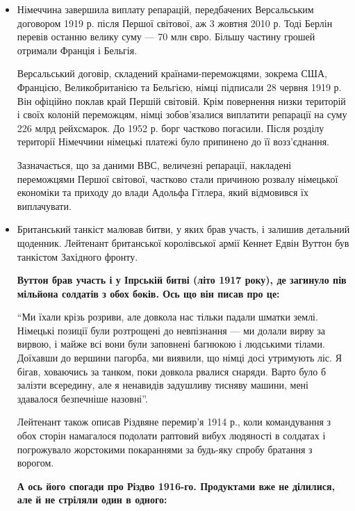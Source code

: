 \begin{itemize}
	
\item  Німеччина завершила виплату репарацій, передбачених Версальським
договором 1919 р. після Першої світової, аж 3 жовтня 2010 р. Тоді
Берлін перевів останню велику суму --- 70 млн євро. Більшу частину
грошей отримали Франція і Бельгія.

Версальський договір, складений країнами-переможцями, зокрема США,
Францією, Великобританією та Бельгією, німці підписали 28 червня 1919 р.
Він офіційно поклав край Першій світовій. Крім повернення низки територій
і своїх колоній переможцям, німці зобов'язалися виплатити репарації на
суму 226 млрд рейхсмарок. До 1952 р. борг частково погасили. Після розділу
території Німеччини німецькі платежі було припинено до її возз'єднання.

Зазначається, що за даними ВВС, величезні репарації, накладені переможцями
Першої світової, частково стали причиною розвалу німецької економіки та
приходу до влади Адольфа Гітлера, який відмовився їх виплачувати.

\item  Британський танкіст малював битви, у яких брав участь, і залишив
детальний щоденник. Лейтенант британської королівської армії Кеннет
Едвін Вуттон був танкістом Західного фронту.

\begin{leftbar}
	\bfseries
Вуттон брав участь і у Іпрській битві (літо 1917 року), де загинуло пів
мільйона солдатів з обох боків. Ось що він писав про це:
\end{leftbar}

\enquote{Ми їхали крізь розриви, але довкола нас тільки падали шматки землі.
Німецькі позиції були розтрощені до невпізнання --- ми долали вирву за
вирвою, і майже всі вони були заповнені багнюкою і людськими тілами.
Доїхавши до вершини пагорба, ми виявили, що німці досі утримують ліс. Я
бігав, ховаючись за танком, поки довкола рвалися снаряди. Варто було б
залізти всередину, але я ненавидів задушливу тисняву машини, мені
здавалося безпечніше назовні}.

Лейтенант також описав Різдвяне перемир'я 1914 р., коли командування з
обох сторін намагалося подолати раптовий вибух людяності в солдатах і
погрожувало жорстокими покараннями за будь-яку спробу братання з ворогом.

\begin{leftbar}
	\bfseries
А ось його спогади про Різдво 1916-го. Продуктами вже не ділилися, але й
не стріляли один в одного:
\end{leftbar}


\end{itemize}
